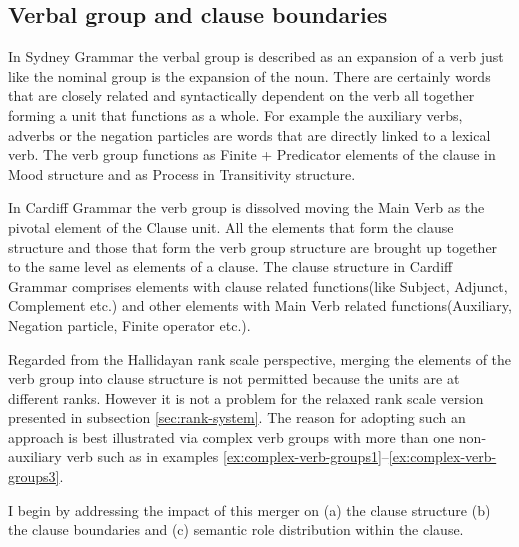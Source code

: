 
\subsection{Verbal group and clause boundaries}
\label{sec:verbal-grpoup-and-clause-division}
In Sydney Grammar the verbal group is described as an expansion of a verb just like the nominal group is the expansion of the noun\citep[396]{Halliday2013}. There are certainly words that are closely related and syntactically dependent on the verb all together forming a unit that functions as a whole. For example the auxiliary verbs, adverbs or the negation particles are words that are directly linked to a lexical verb. The verb group functions as Finite + Predicator elements of the clause in Mood structure and as Process in Transitivity structure. 

In Cardiff Grammar the verb group is dissolved moving the Main Verb as the pivotal element of the Clause unit. All the elements that form the clause structure and those that form the verb group structure are brought up together to the same level as elements of a clause. The clause structure in Cardiff Grammar comprises elements with clause related functions(like Subject, Adjunct, Complement etc.) and other elements with Main Verb related functions(Auxiliary, Negation particle, Finite operator etc.).

Regarded from the Hallidayan rank scale perspective, merging the elements of the verb group into clause structure is not permitted because the units are at different ranks. However it is not a problem for the relaxed rank scale version presented in subsection \ref{sec:rank-system}. The reason for adopting such an approach is best illustrated via complex verb groups with more than one non-auxiliary verb such as in examples \ref{ex:complex-verb-groups1}--\ref{ex:complex-verb-groups3}. 

I begin by addressing the impact of this merger on (a) the clause structure (b) the clause boundaries and (c) semantic role distribution within the clause.

